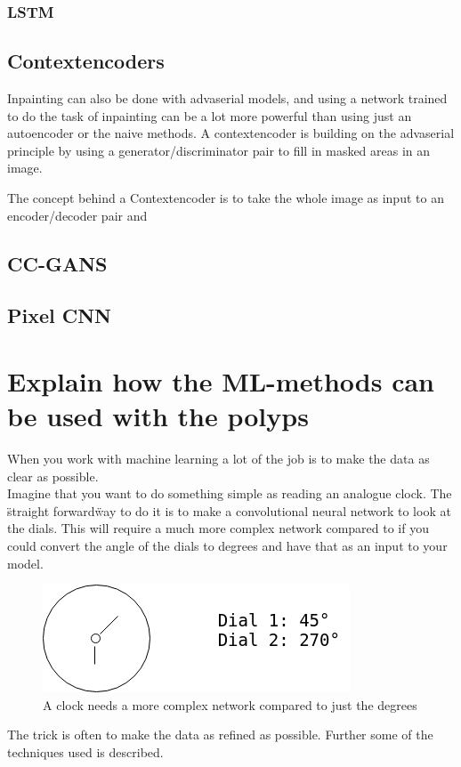 \subsubsection{LSTM}

\subsection{Contextencoders}
Inpainting can also be done with advaserial models, and using a network trained to do the task of inpainting can be a lot more powerful than using just an autoencoder or the naive methods.
A contextencoder is building on the advaserial principle by using a generator/discriminator pair to fill in masked areas in an image. 
	
The concept behind a Contextencoder is to take the whole image as input to an encoder/decoder pair and 
     
\subsection{CC-GANS}  
\subsection{Pixel CNN}
      
    



	    
	  
\section{Explain how the ML-methods can be used with the polyps}
	When you work with machine learning a lot of the job is to make the data as clear as possible. \\
	Imagine that you want to do something simple as reading an analogue clock. The \"straight forward\" way to do it is to  
	make a convolutional neural network to look at the dials. This will require a much more complex network compared to if you could convert the angle of the dials
	to degrees and have that as an input to your model.

	\begin{figure}[ht]
	  \centering
	  \includegraphics[scale=0.5]{methods/figures/Clock.png}
	  \caption{A clock needs a more complex network compared to just the degrees}
	\end{figure}
	The trick is often to make the data as refined as possible. 
	Further some of the techniques used is described.
	
